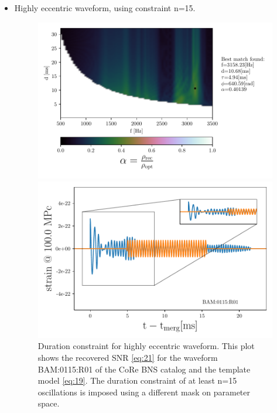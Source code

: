 \begin{itemize}[leftmargin=*]
\FloatBarrier


\item Highly eccentric waveform, using constraint n=15.

\begin{figure}[!htbp]
\begin{center}
\begin{minipage}[t]{0.5\linewidth}
\vspace{0pt}
\includegraphics[scale=0.6,trim={2mm 0 35mm 0},clip]{images/Data_analysis/results/2D_grid_15.pdf}
\end{minipage}%
\begin{minipage}[t]{0.5\linewidth}
\vspace{20pt}
\includegraphics[scale=0.45]{images/Data_analysis/results/2D_grid_16.pdf}
\end{minipage}
\captionsetup{width=0.8\textwidth}
\caption[Duration constraint for highly eccentric waveform]{Duration constraint for highly eccentric waveform. This plot shows the recovered SNR \ref{eq:21} for the waveform BAM:0115:R01 of the CoRe BNS catalog \cite{Dietrich:2018phi} and the template model \ref{eq:19}. The duration constraint of at least n=15 oscillations is imposed using a different mask on parameter space.}
\end{center}
\end{figure}

\FloatBarrier

\end{itemize}


